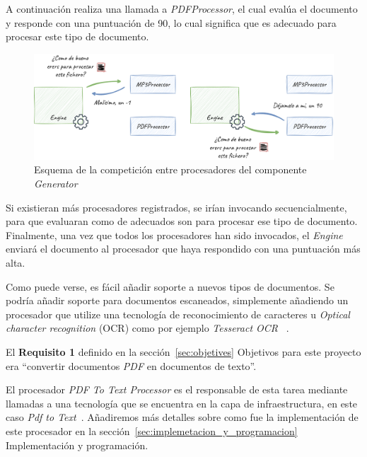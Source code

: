 A continuación realiza una llamada a \textit{PDFProcessor}, el cual evalúa el documento y responde con una puntuación
de 90, lo cual significa que es adecuado para procesar este tipo de documento.

\begin{figure}[ht]
    \begin{center}
        \includegraphics[width=\textwidth]{./chapter/4/images/chapter_4.1.generator_component_processors}
        \caption{Esquema de la competición entre procesadores del componente \textit{Generator}}
        \label{fig:chapter_4.1.generator_component_processors}
    \end{center}
\end{figure}

Si existieran más procesadores registrados, se irían invocando secuencialmente, para que evaluaran como de adecuados
son para procesar ese tipo de documento.
Finalmente, una vez que todos los procesadores han sido invocados, el \textit{Engine} enviará el documento al procesador
que haya respondido con una puntuación más alta.

Como puede verse, es fácil añadir soporte a nuevos tipos de documentos.
Se podría añadir soporte para documentos escaneados, simplemente añadiendo un procesador que utilize una tecnología
de reconocimiento de caracteres u \textit{Optical character recognition} (OCR) como por ejemplo \textit{Tesseract OCR}
~\cite{url_tesseract}.

El \textbf{Requisito 1} definido en la sección~\ref{sec:objetives} Objetivos para este proyecto era
``convertir documentos \textit{PDF} en documentos de texto''.

El procesador \textit{PDF To Text Processor} es el responsable de esta tarea mediante llamadas a una tecnología que se
encuentra en la capa de infraestructura, en este caso
\textit{Pdf to Text}~\cite{url_pdftotextl}.
Añadiremos más detalles sobre como fue la implementación de este procesador en la
sección~\ref{sec:implemetacion_y_programacion} Implementación y programación.


